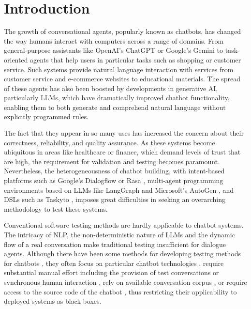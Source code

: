
\chapter{Introduction}\label{chapter:introduction}



The growth of conversational agents, popularly known as chatbots,
has changed the way humans interact with computers across a range of domains.
From general-purpose assistants like OpenAI's ChatGPT \autocite{ChatGPT} or Google's Gemini \autocite{GoogleGemini} to task-oriented agents that help users in particular tasks such as shopping or customer service.
Such systems provide natural language interaction with services from customer service and e-commerce websites to educational materials.
The spread of these agents has also been boosted by developments in generative \ac{AI}, particularly \acp{LLM}, which have dramatically improved chatbot functionality, enabling them to both generate and comprehend natural language without explicitly programmed rules.

The fact that they appear in so many uses has increased the concern about their correctness, reliability, and quality assurance.
As these systems become ubiquitous in areas like healthcare or finance, which demand levels of trust that are high, the requirement for validation and testing becomes paramount.
Nevertheless, the heterogeneousness of chatbot building, with intent-based platforms such as Google's Dialogflow \autocite{Dialogflow} or Rasa \autocite{Rasa2020}, multi-agent programming environments based on \acp{LLM} like LangGraph \autocite{LangGraph} and Microsoft's AutoGen \autocite{AutoGen}, and \acp{DSL} such as Taskyto \autocite{sanchezcuadradoAutomatingDevelopmentTaskoriented2024}, imposes great difficulties in seeking an overarching methodology to test these systems.


Conventional software testing methods are hardly applicable to chatbot systems.
The intricacy of \ac{NLP}, the non-deterministic nature of \acp{LLM} and the dynamic flow of a real conversation make traditional testing insufficient for dialogue agents.
Although there have been some methods for developing testing methods for chatbots \cite{cuadradoIntegratingStaticQuality2024, canizaresMeasuringClusteringHeterogeneous2024}, they often focus on particular chatbot technologies \autocite{RasaTest2025}, require substantial manual effort including the provision of test conversations \autocite{CyaraBotium, RasaTest2025} or synchronous human interaction \autocite{renEvaluationTechniquesChatbot2019}, rely on available conversation corpus \autocite{vasconcelosBottesterTestingConversational2017}, or require access to the source code of the chatbot \autocite{canizaresCoveragebasedStrategiesAutomated2024, gomez-abajoMutationTestingTaskOriented2024, urricoMutaBotMutationTesting2024}, thus restricting their applicability to deployed systems as black boxes.


